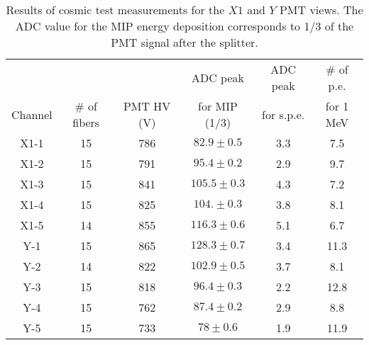 \begin{table}[hbt!]
\begin{center}
\begin{tabular}{|c|c|c|c|c|c|} \hline 
    & &  & ADC peak & ADC
peak & \# of p.e. \\ 
Channel & \# of fibers & PMT HV (V)  & for MIP (1/3) & for s.p.e.
& for 1 MeV \\ 
\hline
X1-1 & 15 & 786 & $82.9\pm0.5$& 3.3& 7.5 \\
X1-2 & 15 & 791 & $95.4\pm0.2$& 2.9& 9.7 \\
X1-3 & 15 & 841 & $105.5\pm0.3$& 4.3& 7.2 \\
X1-4 & 15 & 825 & $104.\pm0.3$& 3.8& 8.1 \\
X1-5 & 14 & 855 & $116.3\pm0.6$& 5.1& 6.7 \\
Y-1 & 15 & 865 & $128.3\pm0.7$& 3.4& 11.3 \\
Y-2 & 14 & 822 & $102.9\pm0.5$& 3.7& 8.1 \\
Y-3 & 15 & 818 & $96.4\pm0.3$& 2.2& 12.8 \\
Y-4 & 15 & 762 & $87.4\pm0.2$& 2.9& 8.8 \\
Y-5 & 15 & 733 & $78\pm0.6$&1.9& 11.9 \\
\hline
\end{tabular}
\end{center} 
\caption{\small{Results of cosmic test measurements for the $X1$ and $Y$
PMT views.  The ADC value for the MIP energy deposition corresponds to 
1/3 of the PMT signal after the splitter.}} 
\label{tab:pestat} 
\end{table} 

\clearpage